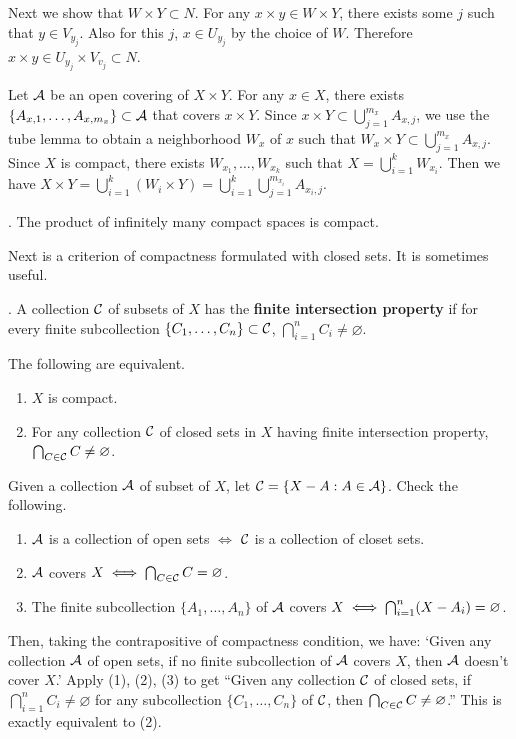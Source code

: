 Next we show that \(W \times Y \subset N\). For any \(x\times y \in W \times Y\), there exists some \(j\) such that \(y \in V_{y_j}\). Also for this \(j\), \(x \in U_{y_j}\) by the choice of \(W\). Therefore \(x \times y \in U_{y_j} \times V_{v_j} \subset N\).

 Let \(\mathcal{A}\) be an open covering of \(X \times Y\). For any \(x \in X\), there exists \(\{A_{x, 1}, \dots, A_{x, m_x}\} \subset \mathcal{A}\) that covers \(x \times Y\). Since \(x \times Y \subset \bigcup_{j=1}^{m_x} A_{x, j}\), we use the tube lemma to obtain a neighborhood \(W_x\) of \(x\) such that \(W_x \times Y \subset \bigcup_{j=1}^{m_x} A_{x, j}\). Since \(X\) is compact, there exists \(W_{x_1}, \dots, W_{x_k}\) such that \(X = \bigcup_{i=1}^k W_{x_i}\). Then we have \(X \times Y = \bigcup_{i=1}^k (W_i \times Y) = \bigcup_{i=1}^k \bigcup_{j=1}^{m_{x_i}} A_{x_i, j}\).

\thm.  The product of infinitely many compact spaces is compact.

Next is a criterion of compactness formulated with closed sets. It is sometimes useful.

.  A collection \(\mathcal{C}\) of subsets of \(X\) has the \textbf{finite intersection property} if for every finite subcollection \(\{C_1, \dots, C_n\} \subset \mathcal{C}\), \(\bigcap_{i=1}^n C_i \neq \varnothing\).

 The following are equivalent.
\begin{enumerate}
    \item \(X\) is compact.
    \item For any collection \(\mathcal{C}\) of closed sets in \(X\) having finite intersection property, \(\bigcap_{C \in \mathcal{C}} C \neq \varnothing\).
\end{enumerate}

\pf Given a collection \(\mathcal{A}\) of subset of \(X\), let \(\mathcal{C} = \{X - A : A \in \mathcal{A}\}\). Check the following.
\begin{enumerate}
    \item \(\mathcal{A}\) is a collection of open sets \(\iff\) \(\mathcal{C}\) is a collection of closet sets.
    \item \(\mathcal{A}\) covers \(X \iff \bigcap_{C \in \mathcal{C}} C = \varnothing\).
    \item The finite subcollection \(\{A_1, \dots, A_n\}\) of \(\mathcal{A}\) covers \(X \iff \bigcap_{i=1}^n (X - A_i) = \varnothing\).
\end{enumerate}
Then, taking the contrapositive of compactness condition, we have: `Given any collection \(\mathcal{A}\) of open sets, if no finite subcollection of \(\mathcal{A}\) covers \(X\), then \(\mathcal{A}\) doesn't cover \(X\).' Apply (1), (2), (3) to get ``Given any collection \(\mathcal{C}\) of closed sets, if \(\bigcap_{i=1}^n C_i \neq \varnothing\) for any subcollection \(\{C_1, \dots, C_n\}\) of \(\mathcal{C}\), then \(\bigcap_{C \in \mathcal{C}} C \neq \varnothing\).'' This is exactly equivalent to (2).

